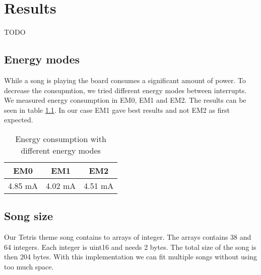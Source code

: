\chapter{Results}
TODO

\section{Energy modes}
\label{sec:energyModeResults}
While a song is playing the board consumes a significant amount of power. To decrease the consupmtion, we tried different energy modes between interrupts. We measured energy consumption in EM0, EM1 and EM2. The results can be seen in table \ref{tab:benchmarkEnergyModes}. In our case EM1 gave best results and not EM2 as first expected.

\begin{table}[ht]
	\begin{center}
	\begin{tabular}{ |c|c|c| }
	  \hline
	  EM0 & EM1 & EM2 \\
	  \hline
	  4.85 mA & 4.02 mA & 4.51 mA \\
	  \hline

	\end{tabular}
	\caption{Energy consumption with different energy modes}
	\label{tab:benchmarkEnergyModes}
	\end{center}
\end{table}

\section{Song size}
Our Tetris theme song contains to arrays of integer. The arrays contains 38 and 64 integers. Each integer is uint16 and needs 2 bytes. The total size of the song is then 204 bytes. With this implementation we can fit multiple songs without using too much space.